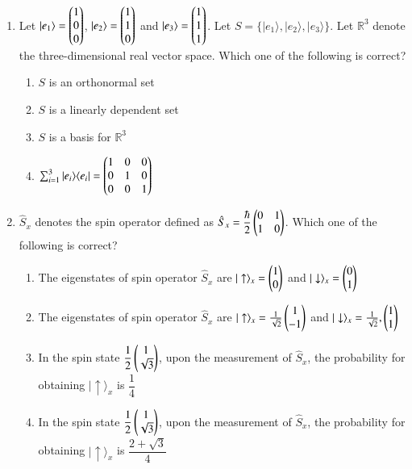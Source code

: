\documentclass[journal,12pt,onecolumn]{IEEEtran}
\theoremstyle{remark}
\begin{document}
\begin{enumerate}
    \item Let $|e_1\rangle = \begin{pmatrix}1\\0\\0\end{pmatrix}$, $|e_2\rangle = \begin{pmatrix}1\\1\\0\end{pmatrix}$ and $|e_3\rangle = \begin{pmatrix}1\\1\\1\end{pmatrix}$. Let $S = \{|e_1\rangle, |e_2\rangle, |e_3\rangle\}$. Let $\mathbb{R}^3$ denote the three-dimensional real vector space. Which one of the following is correct?
    
    \begin{enumerate}
        \item $S$ is an orthonormal set
        \item $S$ is a linearly dependent set
        \item $S$ is a basis for $\mathbb{R}^3$
        \item $\sum_{i=1}^3|e_i\rangle\langle e_i|=
        \begin{pmatrix}
            1 & 0 & 0\\
            0 & 1 & 0\\
            0 & 0 & 1\end{pmatrix}
        $
    \end{enumerate}
    
    \item $\hat{S}_x$ denotes the spin operator defined as $\hat{S}_x = \dfrac{\hbar}{2}\begin{pmatrix}0 & 1 \\ 1 & 0\end{pmatrix}$. Which one of the following is correct?
    
    \begin{enumerate}
        \item The eigenstates of spin operator $\hat{S}_x$ are $|\uparrow\rangle_x = \begin{pmatrix}1\\0\end{pmatrix}$ and $|\downarrow\rangle_x = \begin{pmatrix}0\\1\end{pmatrix}$
        \item The eigenstates of spin operator $\hat{S}_x$ are $|\uparrow\rangle_x = \frac{1}{\sqrt{2}}\begin{pmatrix}1\\-1\end{pmatrix}$ and $|\downarrow\rangle_x = \frac{1}{\sqrt{2}},\begin{pmatrix}1\\1\end{pmatrix}$
        \item In the spin state $\dfrac{1}{2}\begin{pmatrix}1\\\sqrt{3}\end{pmatrix}$, upon the measurement of $\hat{S}_x$, the probability for obtaining $|\uparrow\rangle_x$ is $\dfrac{1}{4}$
        \item In the spin state $\dfrac{1}{2}\begin{pmatrix}1\\\sqrt{3}\end{pmatrix}$, upon the measurement of $\hat{S}_x$, the probability for obtaining $|\uparrow\rangle_x$ is $\dfrac{2+\sqrt{3}}{4}$
    \end{enumerate}
    

\end{enumerate}
\end{document}
